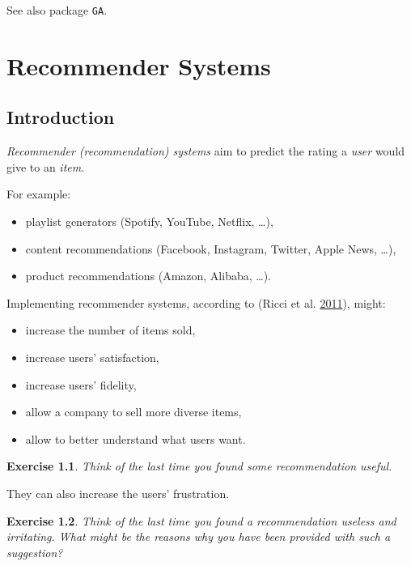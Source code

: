 \documentclass[10pt,b5paper,krantz1]{krantz}
\providecommand{\tightlist}{%
  \setlength{\itemsep}{0pt}\setlength{\parskip}{0pt}}
\newtheorem{exercise}{Exercise}[chapter]
\begin{document}
See also package \texttt{GA}.

\hypertarget{recommender-systems}{%
\chapter{Recommender Systems}\label{recommender-systems}}

\hypertarget{introduction-16}{%
\section{Introduction}\label{introduction-16}}

\emph{Recommender (recommendation) systems}
aim to predict the rating a \emph{user} would give to an \emph{item}.

For example:

\begin{itemize}
\tightlist
\item
  playlist generators (Spotify, YouTube, Netflix, \ldots{}),
\item
  content recommendations (Facebook, Instagram, Twitter, Apple News, \ldots{}),
\item
  product recommendations (Amazon, Alibaba, \ldots{}).
\end{itemize}

Implementing recommender systems, according to (Ricci et al. \protect\hyperlink{ref-ricci_etal}{2011}),
might:

\begin{itemize}
\tightlist
\item
  increase the number of items sold,
\item
  increase users' satisfaction,
\item
  increase users' fidelity,
\item
  allow a company to sell more diverse items,
\item
  allow to better understand what users want.
\end{itemize}

\begin{exercise}

Think of the last time you found some recommendation useful.

\end{exercise}

They can also increase the users' frustration.

\begin{exercise}

Think of the last time you found a recommendation useless and
irritating. What might be the reasons why you have been provided
with such a suggestion?

\end{exercise}
\end{document}
